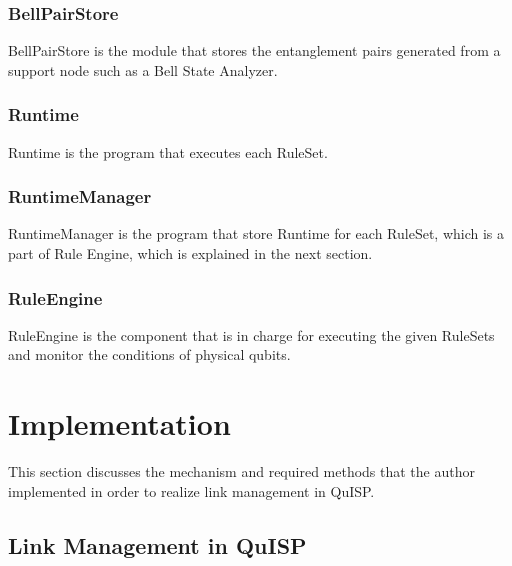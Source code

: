 \subsubsection{BellPairStore}
BellPairStore is the module that stores the entanglement pairs generated from a support node such as a Bell State Analyzer.

\subsubsection{Runtime}
Runtime is the program that executes each RuleSet.

\subsubsection{RuntimeManager}
RuntimeManager is the program that store Runtime for each RuleSet, which is a part of Rule Engine, which is explained in the next section.

\subsubsection{RuleEngine}
RuleEngine is the component that is in charge for executing the given RuleSets and monitor the conditions of physical qubits.


\section{Implementation}

This section discusses the mechanism and required methods that the author implemented in order to realize link management in QuISP.

\subsection{Link Management in QuISP}

